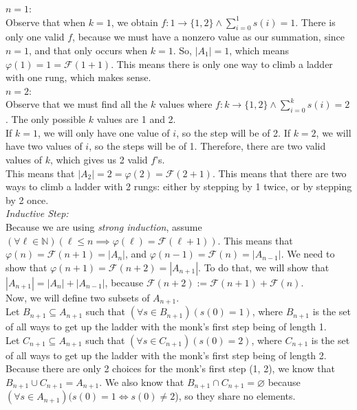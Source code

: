 \documentclass[11pt,a4paper]{article}
\begin{document}
\begin{enumerate}
    $ n = 1$: \\
    Observe that when $k = 1$, we obtain $f: 1 \rightarrow \{1, 2\} \land \sum_{i=0}^{1}s(i) = 1 $. There is only one valid $f$, because we must have a nonzero value as our summation, since $n = 1$, and that only occurs when $k = 1$. 
    So, $|A_1| = 1 $, which means $\varphi(1) = 1 = \mathcal{F}(1 + 1) $. This means there is only one way to climb a ladder with one rung, which makes sense. \\
    $n = 2$: \\
    Observe that we must find all the $k$ values where $f: k \rightarrow \{1, 2\} \land \sum_{i=0}^{k}s(i) = 2  $. The only possible $k$ values are 1 and 2. \\
    If $k = 1$, we will only have one value of $i$, so the step will be of 2. If $k = 2$, we will have two values of $i$, so the steps will be of 1. Therefore, there are two valid values of $k$, which gives us 2 valid $f$'s. \\
    This means that $|A_2| = 2 = \varphi(2) = \mathcal{F}(2 + 1)$. This means that there are two ways to climb a ladder with 2 rungs: either by stepping by 1 twice, or by stepping by 2 once. \\
    \emph{Inductive Step:} \\
    Because we are using \emph{strong induction}, assume $(\forall \ell \in \mathbb{N})(\ell \leq n \implies \varphi(\ell) = \mathcal{F}(\ell + 1)) $. 
    This means that $\varphi(n) = \mathcal{F}(n + 1) = |A_n| $, and $\varphi(n - 1) = \mathcal{F}(n) = |A_{n-1}| $. We need to show that $\varphi(n + 1) = \mathcal{F}(n + 2) = |A_{n + 1}|$.
    To do that, we will show that $|A_{n+1}| = |A_n| + |A_{n-1}| $, because $\mathcal{F}(n+2) := \mathcal{F}(n+1) + \mathcal{F}(n) $. \\
    Now, we will define two subsets of $A_{n+1}$. \\
    Let $B_{n+1} \subseteq A_{n+1} $ such that $(\forall s \in B_{n+1})(s(0) = 1) $, where $B_{n+1}$ is the set of all ways to get up the ladder with the monk's first step being of length 1. \\
    Let $C_{n+1} \subseteq A_{n+1} $ such that $(\forall s \in C_{n+1})(s(0) = 2) $, where $C_{n+1} $ is the set of all ways to get up the ladder with the monk's first step being of length 2. \\
    Because there are only 2 choices for the monk's first step (1, 2), we know that $B_{n+1} \cup C_{n+1} = A_{n+1} $. We also know that $B_{n+1} \cap C_{n+1} = \varnothing$ because $(\forall s \in A_{n+1})(s(0) = 1 \Longleftrightarrow s(0) \neq 2$), so they share no elements. 

\end{enumerate}
\end{document}
